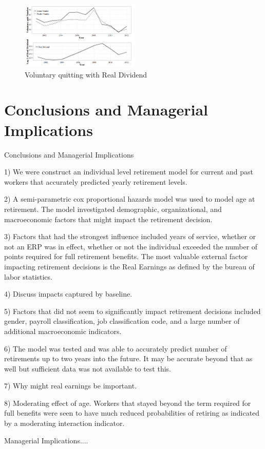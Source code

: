 \documentclass[12pt,letterpaper]{article}
\begin{document}
\begin{figure}
	\centering
	\includegraphics[width=0.5\textwidth]{realdividend.png}
	\caption{Voluntary quitting with Real Dividend}
	\label{fig:vqrealdividend}
\end{figure}


\section{Conclusions and Managerial Implications}
Conclusions and Managerial Implications

1) We were construct an individual level retirement model for current and past workers that accurately predicted yearly retirement levels.

2) A semi-parametric cox proportional hazards model was used to model age at retirement.  The model investigated demographic, organizational, and macroeconomic factors that might impact the retirement decision.

3) Factors that had the strongest influence included years of service, whether or not an ERP was in effect, whether or not the individual exceeded the number of points required for full retirement benefits.  The most valuable external factor impacting retirement decisions is the Real Earnings as defined by the bureau of labor statistics.

4) Discuss impacts captured by baseline.

5) Factors that did not seem to significantly impact retirement decisions included gender, payroll classification, job classification code, and a large number of additional macroeconomic indicators.

6) The model was tested and was able to accurately predict number of retirements up to two years into the future.  It may be accurate beyond that as well but sufficient data was not available to test this.

7) Why might real earnings be important.

8) Moderating effect of age.  Workers that stayed beyond the term required for full benefits were seen to have much reduced probabilities of retiring as indicated by a moderating interaction indicator.


Managerial Implications....

	
\end{document}
